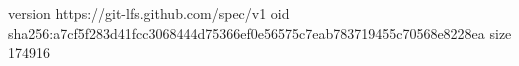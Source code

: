 version https://git-lfs.github.com/spec/v1
oid sha256:a7cf5f283d41fcc3068444d75366ef0e56575c7eab783719455c70568e8228ea
size 174916
